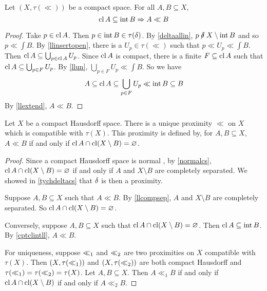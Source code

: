 \begin{proposition}
	\label{cptclintll}
	Let \( (X,\tau(\ll)) \) be a compact space.  For all \( A,B \subseteq X \),
	\[ \operatorname{cl}{A} \subseteq \operatorname{int}{B} \Rightarrow A \ll B \]
\end{proposition}
\begin{proof}
	Take \( p \in \operatorname{cl}{A} \).  Then \( p \in \operatorname{int}{B} \in \tau(\mathord{\delta}) \).  By \ref{deltaallin}, \( p \nnear X \setminus \int{B} \) and so \( p \ll \int{B} \).  By \ref{llinsertopen}, there is a \( U_p \in \tau(\ll) \) such that \( p \ll U_p \ll \int{B} \).  Then \( \operatorname{cl}{A} \subseteq \bigcup_{p \in \operatorname{cl}{A}} U_p \).  Since \( \operatorname{cl}{A} \) is compact, there is a finite \( F \subseteq \operatorname{cl}{A} \) such that \( \operatorname{cl}{A} \subseteq \bigcup_{p \in F} U_p \).  By \ref{llun}, \( \bigcup_{p \in F} U_p \ll \int{B} \).  So we have
	\[ A \subseteq \operatorname{cl}{A} \subseteq \bigcup_{p \in F} U_p \ll \operatorname{int}{B} \subseteq B \]
	By \ref{llextend}, \( A \ll B \).
\end{proof}

\begin{theorem}
	\label{cpttunique}
	Let \( X \) be a compact Hausdorff space.  There is a unique proximity \( \ll \) on \( X \) which is compatible with \( \tau(X) \).  This proximity is defined by, for \( A,B \subseteq X \), \( A \ll B \) if and only if \( \operatorname{cl}{A} \cap \operatorname{cl}(X \setminus B) = \varnothing \).
\end{theorem}
\begin{proof}
	Since a compact Hausdorff space is normal \cite{kelley}, by \ref{normalcs}, \( \operatorname{cl}{A} \cap \operatorname{cl}(X \setminus B) = \varnothing \) if and only if \( A \) and \( X \setminus B \) are completely separated.  We showed in \ref{tychdeltacs} that \( \mathbin{\delta} \) is then a proximity.
	
	Suppose \( A, B \subseteq X \) such that \( A \ll B \).  By \ref{llcompsep}, \( A \) and \( X \setminus B \) are completely separated.  So \( \operatorname{cl}{A} \cap \operatorname{cl}(X \setminus B) = \varnothing \).
	
	Conversely, suppose \( A,B \subseteq X \) such that \( \operatorname{cl}{A} \cap \operatorname{cl}(X \setminus B) = \varnothing \).  Then \( \operatorname{cl}{A} \subseteq \operatorname{int}{B} \).  By \ref{cptclintll}, \( A \ll B \).
	
	For uniqueness, suppose \( \mathord{\ll}_1 \) and \( \mathord{\ll}_2 \) are two proximities on \( X \) compatible with \( \tau(X) \).  Then \( (X,\tau(\mathord{\ll}_1)) \) and \( (X,\tau(\mathord{\ll}_2)) \) are both compact Hausdorff and \( \tau(\mathord{\ll}_1) = \tau(\mathord{\ll}_2) = \tau(X) \).  Let \( A,B \subseteq X \).  Then \( A \ll_1 B \) if and only if \( \operatorname{cl}{A} \cap \operatorname{cl}(X \setminus B) \) if and only if \( A \ll_2 B \).
\end{proof}

